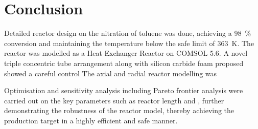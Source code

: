 \section{Conclusion} \label{sec:conclusion}
Detailed reactor design on the nitration of toluene was done, achieving a \SI{98}{\%} conversion and maintaining the temperature below the safe limit of \SI{363}{\K}. The reactor was modelled as a Heat Exchanger Reactor on COMSOL 5.6. A novel triple concentric tube arrangement along with silicon carbide foam proposed showed a careful control
The axial and radial reactor modelling was 

Optimisation and sensitivity analysis including Pareto frontier analysis were carried out on the key parameters such as reactor length and , further demonstrating the robustness of the reactor model, thereby achieving the production target in a highly efficient and safe manner.  

